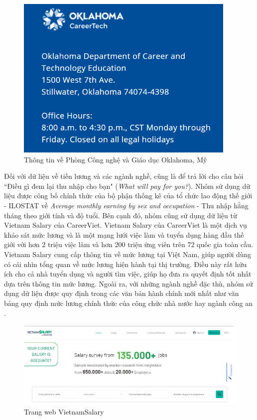 \begin{figure}[H]
    \centering
    \includegraphics[width=0.65\linewidth]{images/chap3/oklahomaInfo.png}
    \vspace{0.5cm}
    \caption{Thông tin về Phòng Công nghệ và Giáo dục Oklahoma, Mỹ}
\end{figure}

Đối với dữ liệu về tiền lương và các ngành nghề, cũng là để trả lời cho câu hỏi ``Điều gì đem lại thu nhập cho bạn" (\textit{What will pay for you?}). Nhóm sử dụng dữ liệu được công bố chính thức của bộ phận thống kê của tổ chức lao động thế giới - ILOSTAT về \textit{Average monthly earning by sex and occupation} - Thu nhập hằng tháng theo giới tính và độ tuổi. Bên cạnh đó, nhóm cũng sử dụng dữ liệu từ Vietnam Salary của CareerViet. Vietnam Salary của CareerViet là một dịch vụ khảo sát mức lương và là một mạng lưới việc làm và tuyển dụng hàng đầu thế giới với hơn 2 triệu việc làm và hơn 200 triệu ứng viên trên 72 quốc gia toàn cầu. Vietnam Salary cung cấp thông tin về mức lương tại Việt Nam, giúp người dùng có cái nhìn tổng quan về mức lương hiện hành tại thị trường. Điều này rất hữu ích cho cả nhà tuyển dụng và người tìm việc, giúp họ đưa ra quyết định tốt nhất dựa trên thông tin mức lương. Ngoài ra, với những ngành nghề đặc thù, nhóm sử dụng dữ liệu được quy định trong các văn bản hành chính mới nhất như văn bảng quy định mức lương chính thức của công chức nhà nước hay ngành công an \cite{thuvienphapluat} \cite{tuoitre} \cite{hocmai} \cite{umt} \cite{topcv} \cite{xaydungchinhsach}.

\begin{figure}[H]
    \centering
    \includegraphics[width=0.8\linewidth]{images/chap3/VietnamSalary.png}
    \vspace{0.6cm}
    \caption{Trang web VietnamSalary}
\end{figure}

